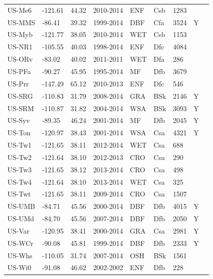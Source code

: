 \documentclass{myreport}
\begin{document}
\begin{longtable}{lllllllll}
  US-Me6 & -121.61 & 44.32 & 2010-2014 & ENF & Csb & 1283 &  & \cite{US-Me6} \\ 
  US-MMS & -86.41 & 39.32 & 1999-2014 & DBF & Cfa & 3524 & Y & \cite{US-MMS} \\ 
  US-Myb & -121.77 & 38.05 & 2010-2014 & WET & Csb & 1153 &  & \cite{US-Myb} \\ 
  US-NR1 & -105.55 & 40.03 & 1998-2014 & ENF & Dfc & 4084 &  & \cite{US-NR1} \\ 
  US-ORv & -83.02 & 40.02 & 2011-2011 & WET & Dfa & 286 &  & \cite{US-ORv} \\ 
  US-PFa & -90.27 & 45.95 & 1995-2014 & MF & Dfb & 3679 &  & \cite{US-PFa} \\ 
  US-Prr & -147.49 & 65.12 & 2010-2013 & ENF & Dfc & 546 &  & \cite{US-Prr} \\ 
  US-SRG & -110.83 & 31.79 & 2008-2014 & GRA & BSk & 2146 & Y & \cite{US-SRG} \\ 
  US-SRM & -110.87 & 31.82 & 2004-2014 & WSA & BSk & 3093 & Y & \cite{US-SRM} \\ 
  US-Syv & -89.35 & 46.24 & 2001-2014 & MF & Dfb & 2045 & Y & \cite{US-Syv} \\ 
  US-Ton & -120.97 & 38.43 & 2001-2014 & WSA & Csa & 4321 & Y & \cite{US-Ton} \\ 
  US-Tw1 & -121.65 & 38.11 & 2012-2014 & WET & Csa & 688 &  & \cite{US-Tw1} \\ 
  US-Tw2 & -121.64 & 38.10 & 2012-2013 & CRO & Csa & 290 &  & \cite{US-Tw2} \\ 
  US-Tw3 & -121.65 & 38.12 & 2013-2014 & CRO & Csa & 498 &  & \cite{US-Tw3} \\ 
  US-Tw4 & -121.64 & 38.10 & 2013-2014 & WET & Csa & 325 &  & \cite{US-Tw4} \\ 
  US-Twt & -121.65 & 38.11 & 2009-2014 & CRO & Csa & 1507 &  & \cite{US-Twt} \\ 
  US-UMB & -84.71 & 45.56 & 2000-2014 & DBF & Dfb & 4015 & Y & \cite{US-UMB} \\ 
  US-UMd & -84.70 & 45.56 & 2007-2014 & DBF & Dfb & 2050 & Y & \cite{US-UMd} \\ 
  US-Var & -120.95 & 38.41 & 2000-2014 & GRA & Csa & 2981 & Y & \cite{US-Var} \\ 
  US-WCr & -90.08 & 45.81 & 1999-2014 & DBF & Dfb & 2333 & Y & \cite{US-WCr} \\ 
  US-Whs & -110.05 & 31.74 & 2007-2014 & OSH & BSk & 1561 &  & \cite{US-Whs} \\ 
  US-Wi0 & -91.08 & 46.62 & 2002-2002 & ENF & Dfb & 228 &  & \cite{US-Wi0} \\ 

\end{longtable}
\end{document}
